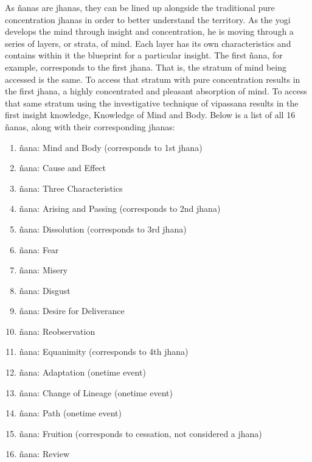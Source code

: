 \documentclass[a5paper,10pt,english]{book}
\begin{document}
\sphinxAtStartPar
As ñanas are jhanas, they can be lined up alongside the traditional pure
concentration jhanas in order to better understand the territory. As the
yogi develops the mind through insight and concentration, he is moving
through a series of layers, or strata, of mind. Each layer has its own
characteristics and contains within it the blueprint for a particular
insight. The first ñana, for example, corresponds to the first jhana.
That is, the stratum of mind being accessed is the same. To access that
stratum with pure concentration results in the first jhana, a highly
concentrated and pleasant absorption of mind. To access that same
stratum using the investigative technique of vipassana results in the
first insight knowledge, Knowledge of Mind and Body. Below is a list of
all 16 ñanas, along with their corresponding jhanas:
\begin{enumerate}
%
\item {} 
\sphinxAtStartPar
ñana: Mind and Body (corresponds to 1st jhana)

\item {} 
\sphinxAtStartPar
ñana: Cause and Effect

\item {} 
\sphinxAtStartPar
ñana: Three Characteristics

\item {} 
\sphinxAtStartPar
ñana: Arising and Passing (corresponds to 2nd jhana)

\item {} 
\sphinxAtStartPar
ñana: Dissolution (corresponds to 3rd jhana)

\item {} 
\sphinxAtStartPar
ñana: Fear

\item {} 
\sphinxAtStartPar
ñana: Misery

\item {} 
\sphinxAtStartPar
ñana: Disgust

\item {} 
\sphinxAtStartPar
ñana: Desire for Deliverance

\item {} 
\sphinxAtStartPar
ñana: Re\sphinxhyphen{}observation

\item {} 
\sphinxAtStartPar
ñana: Equanimity (corresponds to 4th jhana)

\item {} 
\sphinxAtStartPar
ñana: Adaptation (one\sphinxhyphen{}time event)

\item {} 
\sphinxAtStartPar
ñana: Change of Lineage (one\sphinxhyphen{}time event)

\item {} 
\sphinxAtStartPar
ñana: Path (one\sphinxhyphen{}time event)

\item {} 
\sphinxAtStartPar
ñana: Fruition (corresponds to cessation, not considered a jhana)

\item {} 
\sphinxAtStartPar
ñana: Review

\end{enumerate}
\end{document}
